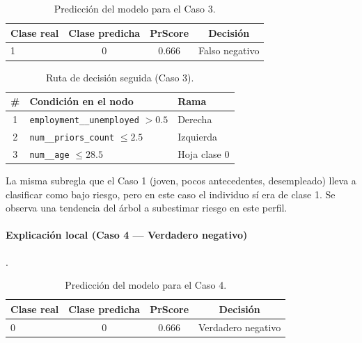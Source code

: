 \begin{table}[h!]
\centering
\caption{Predicción del modelo para el Caso 3.}
\label{tab:local-pred-caso3}
\small
\begin{tabular}{@{}lccc@{}}
\toprule
\textbf{Clase real} & \textbf{Clase predicha} & \textbf{PrScore} & \textbf{Decisión} \\
\midrule
1 & 0 & 0.666 & Falso negativo \\
\bottomrule
\end{tabular}
\end{table}

\begin{table}[h!]
\centering
\caption{Ruta de decisión seguida (Caso 3).}
\label{tab:local-path-caso3}
\small
\begin{tabular}{@{}cll@{}}
\toprule
\# & \textbf{Condición en el nodo} & \textbf{Rama} \\
\midrule
1 & \texttt{employment\_\_unemployed} \(> 0.5\) & Derecha \\
2 & \texttt{num\_\_priors\_count} \(\le 2.5\)   & Izquierda \\
3 & \texttt{num\_\_age} \(\le 28.5\)            & Hoja clase 0 \\
\bottomrule
\end{tabular}
\end{table}

La misma subregla que el Caso 1 (joven, pocos antecedentes, desempleado) lleva a clasificar como bajo riesgo, pero en este caso el individuo sí era de clase 1. Se observa una tendencia del árbol a subestimar riesgo en este perfil.

\paragraph{Explicación local (Caso 4 — Verdadero negativo)}.

\begin{table}[h!]
\centering
\caption{Predicción del modelo para el Caso 4.}
\label{tab:local-pred-caso4}
\small
\begin{tabular}{@{}lccc@{}}
\toprule
\textbf{Clase real} & \textbf{Clase predicha} & \textbf{PrScore} & \textbf{Decisión} \\
\midrule
0 & 0 & 0.666 & Verdadero negativo \\
\bottomrule
\end{tabular}
\end{table}

